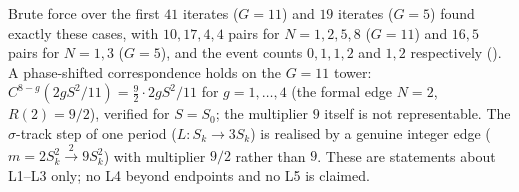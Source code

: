 \begin{remark}
Brute force over the first $41$ iterates ($G=11$) and $19$ iterates ($G=5$) found exactly these cases, with $10,17,4,4$ pairs for $N=1,2,5,8$ ($G=11$) and $16,5$ pairs for $N=1,3$ ($G=5$), and the event counts $0,1,1,2$ and $1,2$ respectively (). A phase-shifted correspondence holds on the $G=11$ tower: $C^{8-g}(2gS^2/11)=\tfrac92\cdot2gS^2/11$ for $g=1,\dots,4$ (the formal edge $N=2$, $R(2)=9/2$), verified for $S=S_0$; the multiplier $9$ itself is not representable. The $\sigma$-track step of one period ($L:S_k\to3S_k$) is realised by a genuine integer edge ($m=2S_k^2\xrightarrow{2}9S_k^2$) with multiplier $9/2$ rather than $9$. These are statements about L1--L3 only; no L4 beyond endpoints and no L5 is claimed.
\end{remark}

